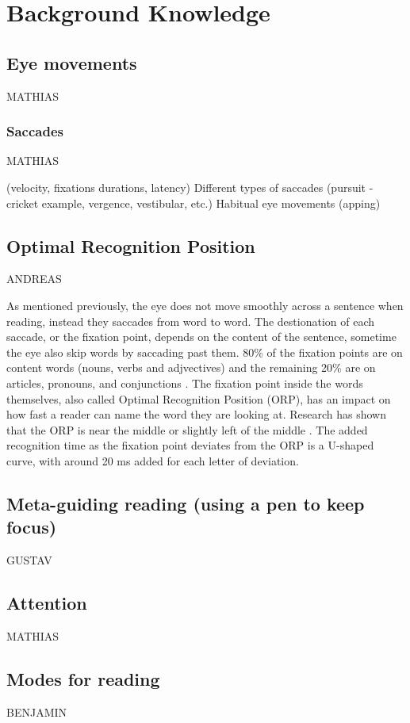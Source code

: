\section{Background Knowledge}

\subsection{Eye movements}
MATHIAS

\subsubsection{Saccades}
MATHIAS

(velocity, fixations durations, latency)
Different types of saccades (pursuit - cricket example, vergence, vestibular, etc.)
Habitual eye movements (apping)
\subsection{Optimal Recognition Position} \label{ORP}
ANDREAS

As mentioned previously, the eye does not move smoothly across a sentence when reading, instead they saccades from word to word. The destionation of each saccade, or the fixation point, depends on the content of the sentence, sometime the eye also skip words by saccading past them. 80\% of the fixation points are on content words (nouns, verbs and adjvectives) and the remaining 20\% are on articles, pronouns, and conjunctions \cite{eysenck_cognitive_2010}. The fixation point inside the words themselves, also called Optimal Recognition Position (ORP), has an impact on how fast a reader can name the word they are looking at. Research has shown that the ORP is near the middle or slightly left of the middle \cite{oregan_optimal_1992, nazir_letter_1998, oregan_convenient_1984}. The added recognition time as the fixation point deviates from the ORP is a U-shaped curve, with around 20 ms added for each letter of deviation.


\subsection{Meta-guiding reading (using a pen to keep focus)}
GUSTAV

\subsection{Attention}
MATHIAS

\subsection{Modes for reading}
BENJAMIN

